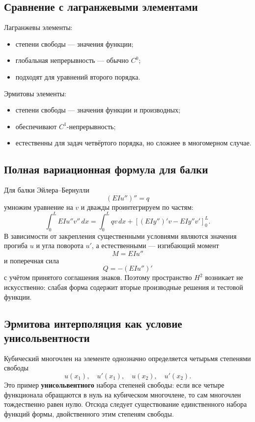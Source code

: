 \subsection{Сравнение с лагранжевыми элементами}

Лагранжевы элементы:
\begin{itemize}
    \item степени свободы --- значения функции;
    \item глобальная непрерывность --- обычно $C^0$;
    \item подходят для уравнений второго порядка.
\end{itemize}

Эрмитовы элементы:
\begin{itemize}
    \item степени свободы --- значения функции и производных;
    \item обеспечивают $C^1$-непрерывность;
    \item естественны для задач четвёртого порядка, но сложнее в многомерном случае.
\end{itemize}

\subsection{Полная вариационная формула для балки}

Для балки Эйлера--Бернулли
\[
    (EIu'')''=q
\]
умножим уравнение на $v$ и дважды проинтегрируем по частям:
\[
 \int_0^L EIu''v''\,dx
 =\int_0^L qv\,dx
 +\left[(EIy'')'v-EIy''v'\right]_{0}^{L}.
\]
В зависимости от закрепления существенными условиями являются значения прогиба $u$ и
угла поворота $u'$, а естественными --- изгибающий момент
\[
    M=EIu''
\]
и поперечная сила
\[
    Q=-(EIu'')'
\]
с учётом принятого соглашения знаков. Поэтому пространство $H^2$ возникает не
искусственно: слабая форма содержит вторые производные решения и тестовой функции.

\subsection{Эрмитова интерполяция как условие унисольвентности}

Кубический многочлен на элементе однозначно определяется четырьмя степенями свободы
\[
    u(x_1),\quad u'(x_1),\quad u(x_2),\quad u'(x_2).
\]
Это пример \textbf{унисольвентного} набора степеней свободы: если все четыре функционала
обращаются в нуль на кубическом многочлене, то сам многочлен тождественно равен нулю.
Отсюда следует существование единственного набора функций формы, двойственного этим
степеням свободы.

